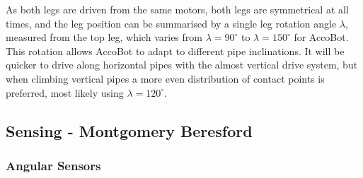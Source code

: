 \documentclass[11pt]{article}		%
\begin{document}
				As both legs are driven from the same motors, both legs are symmetrical at all times, and the leg position can be summarised by a single leg rotation angle $\lambda$, measured from the top leg, which varies from $\lambda = 90^\circ$ to $\lambda = 150^\circ$ for AccoBot.
				This rotation allows AccoBot to adapt to different pipe inclinations.
				It will be quicker to drive along horizontal pipes with the almost vertical drive system, but when climbing vertical pipes a more even distribution of contact points is preferred, most likely using $\lambda = 120^\circ$.
			
		\subsection[Sensing]{Sensing - Montgomery Beresford}
		
		\subsubsection{Angular Sensors}
            		
\end{document}
